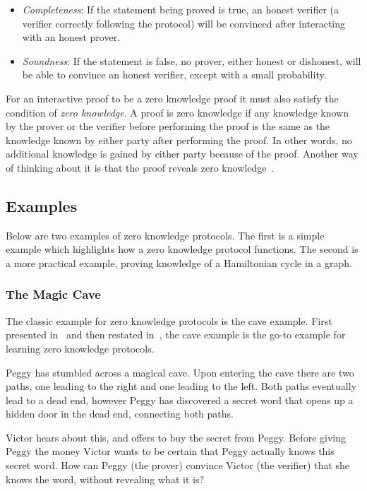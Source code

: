\documentclass{sig-alternate}
\begin{document}
	\begin{itemize}
		\item \textit{Completeness}: If the statement being proved is true, an
		honest verifier (a verifier correctly following the protocol) will be
		convinced after interacting with an honest prover.
			
		\item \textit{Soundness}: If the statement is false, no prover, either
		honest or dishonest, will be able to convince an honest verifier, except
		with a small probability.
	\end{itemize}
	
	For an interactive proof to be a zero knowledge proof it must also
	satisfy the condition of \textit{zero knowledge}.	
	A proof is zero knowledge if any knowledge known by
	the prover or the verifier before performing the proof is the same
	as the knowledge known by either party after performing the proof.			
	In other words, no additional knowledge is gained by either party because
	of the proof. Another way of thinking about it is that the proof reveals 	
	zero knowledge~\cite{Survey}.

	\subsection{Examples}
	
	Below are two examples of zero knowledge protocols. The
	first is a simple example which highlights how a zero knowledge
	protocol functions. The second is a more practical example,
	proving knowledge of a Hamiltonian cycle in a graph.
	
	\subsubsection{The Magic Cave}
	The classic example for zero knowledge protocols is the cave example.
	First presented in~\cite{Children:1987} and then restated
	in~\cite{Survey}, the cave example is the go-to example for learning
	zero knowledge protocols.

	Peggy has stumbled across a magical cave. Upon entering the cave
	there are two paths, one leading to the right and one leading to the
	left. Both paths eventually lead to a dead end, however Peggy has
	discovered a secret word that opens up a hidden door in the dead end,
	connecting both paths.

	Victor hears about this, and offers to buy the secret from Peggy.
	Before giving Peggy the money Victor
	wants to be certain that Peggy actually knows this secret word. How can
	Peggy (the prover) convince Victor (the verifier) that she knows the
	word, without revealing what it is?
\end{document}
